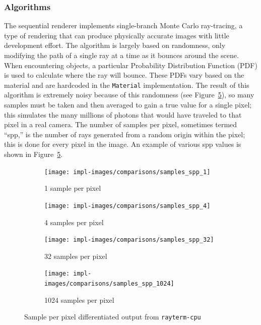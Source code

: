 \subsubsection{Algorithms}
\label{ch:methods:renderer:sequential:algorithms}

The sequential renderer implements single-branch Monte Carlo ray-tracing, a type of rendering that can produce physically accurate images with little development effort.
The algorithm is largely based on randomness, only modifying the path of a single ray at a time as it bounces around the scene.
When encountering objects, a particular Probability Distribution Function (PDF) is used to calculate where the ray will bounce.
These PDFs vary based on the material and are hardcoded in the \texttt{Material} implementation.
The result of this algorithm is extremely noisy because of this randomness (see Figure~\ref{fig:rayterm-cpu_ppm_noisy}), so many samples must be taken and then averaged to gain a true value for a single pixel; this simulates the many millions of photons that would have traveled to that pixel in a real camera.
The number of samples per pixel, sometimes termed ``spp,'' is the number of rays generated from a random origin within the pixel; this is done for every pixel in the image.
An example of various spp values is shown in Figure~\ref{fig:rayterm-cpu_ppm_noisy}.

\vspace{0.3em}
\begin{figure}[htb]
  \centering
  \begin{subfigure}[htb]{0.45\textwidth}
    \texttt{[image: impl-images/comparisons/samples\_spp\_1]}
    \caption{1 sample per pixel}
\label{fig:rayterm-cpu_ppm_noisy_1}
  \end{subfigure}
  \hspace{1em}
  \begin{subfigure}[htb]{0.45\textwidth}
    \texttt{[image: impl-images/comparisons/samples\_spp\_4]}
    \caption{4 samples per pixel}
\label{fig:rayterm-cpu_ppm_noisy_4}
  \end{subfigure}
  \vspace{1em}
  \begin{subfigure}[htb]{0.45\textwidth}
    \texttt{[image: impl-images/comparisons/samples\_spp\_32]}
    \caption{32 samples per pixel}
\label{fig:rayterm-cpu_ppm_noisy_32}
  \end{subfigure}
  \hspace{1em}
  \begin{subfigure}[htb]{0.45\textwidth}
    \texttt{[image: impl-images/comparisons/samples\_spp\_1024]}
    \caption{1024 samples per pixel}
\label{fig:rayterm-cpu_ppm_noisy_1024}
  \end{subfigure}
  \caption{Sample per pixel differentiated output from \texttt{rayterm-cpu}}
\label{fig:rayterm-cpu_ppm_noisy}
\end{figure}

